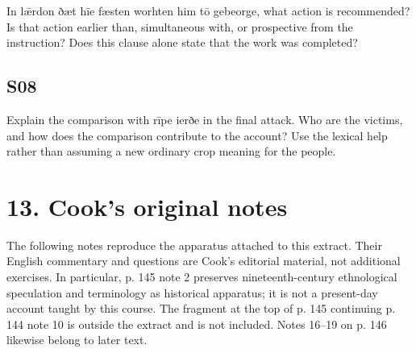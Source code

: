 \par\begin{minipage}{\linewidth}\raggedright
In lǣrdon ðæt hīe fæsten worhten him tō gebeorge, what action is recommended? Is that action earlier than, simultaneous with, or prospective from the instruction? Does this clause alone state that the work was completed?

\end{minipage}\par\addvspace{4pt}

\subsection*{S08}

\par\begin{minipage}{\linewidth}\raggedright
Explain the comparison with rīpe ierðe in the final attack. Who are the victims, and how does the comparison contribute to the account? Use the lexical help rather than assuming a new ordinary crop meaning for the people.

\end{minipage}\par\addvspace{4pt}

\section*{13. Cook’s original notes}

\begingroup\fontsize{10}{12.8}\selectfont
\setlength{\parskip}{1.5pt}
The following notes reproduce the apparatus attached to this extract. Their English commentary and questions are Cook’s editorial material, not additional exercises. In particular, p. 145 note 2 preserves nineteenth-century ethnological speculation and terminology as historical apparatus; it is not a present-day account taught by this course. The fragment at the top of p. 145 continuing p. 144 note 10 is outside the extract and is not included. Notes 16–19 on p. 146 likewise belong to later text.

